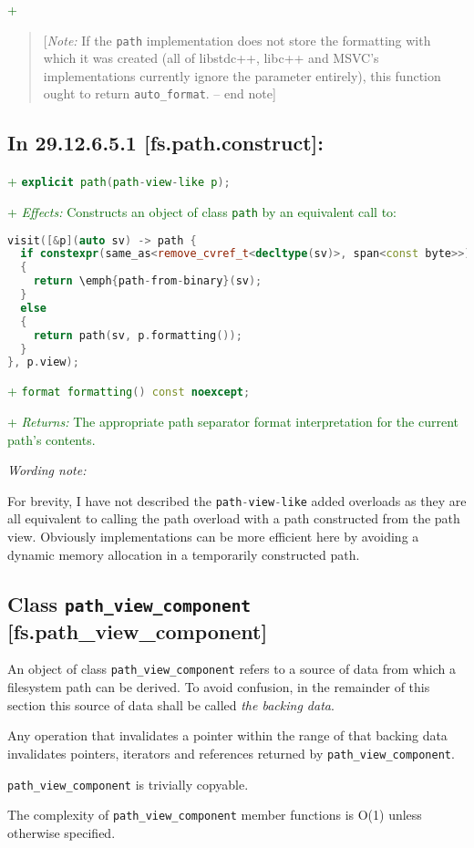\documentclass[11pt]{article}
\newcommand{\code}[2][cpp]{\lstinline[language=#1,basicstyle=\small\ttfamily]{#2}}
\newcommand{\desc}[1]{\textit{#1}}
\newcommand{\effects}{\desc{Effects: }}
\newcommand{\returns}{\desc{Returns: }}
\newcommand{\note}[1]{\begin{quote}[\textit{Note:} #1 -- end note]\end{quote}}
\newcommand{\tsref}[2]{\subsection*{In #2 \textbf{[#1]}:}}
\newcommand{\tsreplace}[3]{\textcolor{red}{\sout{#1}}#2\textcolor{darkgreen}{#3}}
\begin{document}
\tsreplace{}{}{+ \note{If the \code{path} implementation does not store the formatting with which it was created (all of libstdc++, libc++ and MSVC's implementations currently ignore the parameter entirely), this function ought to return \code{auto_format}.}}

\tsref{fs.path.construct}{29.12.6.5.1}

\tsreplace{}{}{+ \code{explicit path(path-view-like p);}}

\tsreplace{}{}{+ \effects Constructs an object of class \code{path} by an equivalent call to:}
\begin{lstlisting}[language=cpp]
visit([&p](auto sv) -> path {
  if constexpr(same_as<remove_cvref_t<decltype(sv)>, span<const byte>>)
  {
    return \emph{path-from-binary}(sv);
  }
  else
  {
    return path(sv, p.formatting());
  }
}, p.view);
\end{lstlisting}

\tsreplace{}{}{+ \code{format formatting() const noexcept;}}

\tsreplace{}{}{+ \returns The appropriate path separator format interpretation for the current path's contents.}

\emph{Wording note:} 

For brevity, I have not described the \code{path-view-like} added overloads as they are all equivalent to calling the path overload with a path constructed from the path view. Obviously implementations can be more efficient here by avoiding a dynamic memory allocation in a temporarily constructed path.

\color{darkgreen}

\subsection*{Class \code{path_view_component} [fs.path\_view\_component]}

An object of class \code{path_view_component} refers to a source of data from which a filesystem path can be derived. To avoid confusion, in the remainder of this section this source of data shall be called \emph{the backing data}.

Any operation that invalidates a pointer within the range of that backing data invalidates pointers, iterators and references returned by \code{path_view_component}.

\code{path_view_component} is trivially copyable.

The complexity of \code{path_view_component} member functions is O(1) unless otherwise specified.
\end{document}
